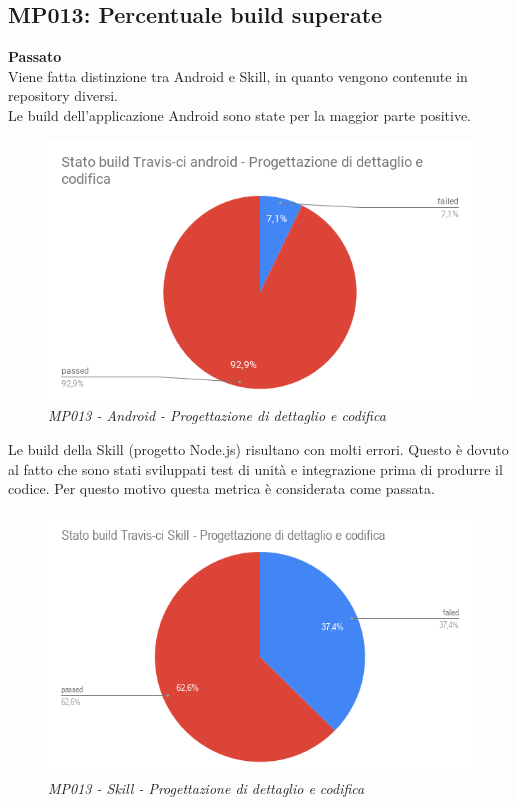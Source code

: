 \subsection{MP013: Percentuale build superate}
\textbf{Passato}\\
Viene fatta distinzione tra Android e Skill, in quanto vengono contenute in repository diversi.\\
Le build dell'applicazione Android sono state per la maggior parte positive. \\
\begin{figure} [H]
    \centering
	\includegraphics[scale=0.4]{./images/buildandroidPDC.png}
    \caption{\textit{MP013 - Android - Progettazione di dettaglio e codifica}}\label{}
\end{figure}
Le build della Skill (progetto Node.js) risultano con molti errori. Questo è dovuto al fatto che sono stati sviluppati test di unità e integrazione prima di produrre il codice. Per questo motivo questa metrica è considerata come passata.\\
\begin{figure} [H]
    \centering
	\includegraphics[scale=0.4]{./images/buildskillPDC.png}
    \caption{\textit{MP013 - Skill - Progettazione di dettaglio e codifica}}\label{}
\end{figure}


